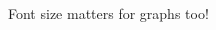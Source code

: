 \documentclass[notes,11pt, aspectratio=169]{beamer}
\begin{document}
\begin{frame}[label=methodology]{Font size matters for graphs too!}
\begin{columns}[T] %
\begin{column}{.58\textwidth}
\end{column}
\end{columns}
\end{frame}
\end{document}
